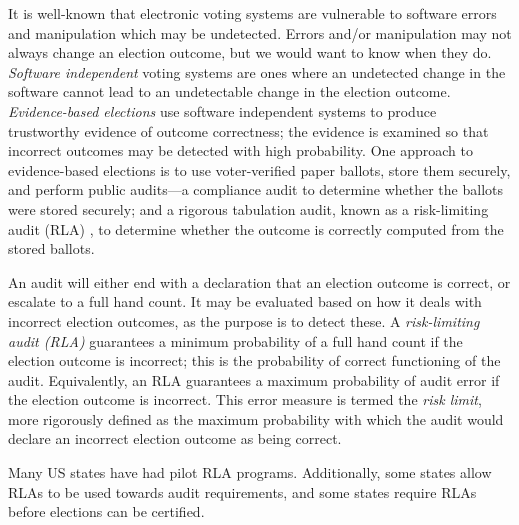 It is well-known that electronic voting systems are vulnerable to software errors and manipulation which may be undetected. Errors and/or manipulation may not always change an election outcome, but we would want to know when they do. {\em Software independent} voting systems \cite{SI-Wack,rivest2008notion} are ones where an undetected change in the software cannot lead to an undetectable change in the election outcome. {\em Evidence-based elections} \cite{evidence-based} use software independent systems to produce trustworthy evidence of outcome correctness; the evidence is examined so that incorrect outcomes may be detected with high probability. One approach to evidence-based elections is to use voter-verified paper ballots, store them securely, and perform public audits---a compliance audit to determine whether the ballots were stored securely; and a rigorous tabulation audit, known as a risk-limiting audit (RLA) \cite{RLA}, to determine whether the outcome is correctly computed from the stored ballots. 

An audit will either end with a declaration that an election outcome is correct, or escalate to a full hand count. It may be evaluated based on how it deals with incorrect election outcomes, as the purpose is to detect these. A {\em risk-limiting audit (RLA)} guarantees a minimum probability of a full hand count if the election outcome is incorrect; this is the probability of correct functioning of the audit. Equivalently, an RLA guarantees a maximum probability of audit error if the election outcome is incorrect. This error measure is termed the {\em risk limit}, more rigorously defined as the maximum probability with which the audit would declare an incorrect election outcome as being correct. 

Many US states have had pilot RLA programs. Additionally, some states allow RLAs to be used towards audit requirements, and some states require RLAs before elections can be certified. 



